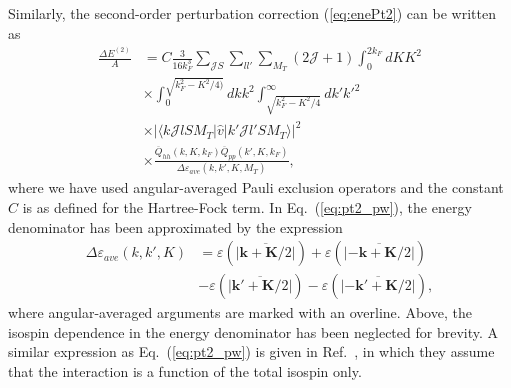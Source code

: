 \documentclass[a4paper,12pt]{report}
\begin{document}
Similarly, the second-order perturbation correction (\ref{eq:enePt2}) can be written as
\begin{align}
  \frac{\Delta E^{(2)}}{A} &= C\frac{3}{16k_{F}^{3}}\sum_{\mathcal{J}S}\sum_{ll'}\sum_{M_{T}}(2\mathcal{J}+1)\int_{0}^{2k_{F}}dK K^{2} \nonumber \\
  & \times \int_{0}^{\sqrt{k_{F}^{2}-K^{2}/4)}}dk k^{2} \int_{\sqrt{k_{F}^{2}-K^{2}/4}}^{\infty }dk' k'^{2} \nonumber \\
  & \times |\langle k\mathcal{J}lSM_{T}|\hat{v}|k'\mathcal{J}l'SM_{T}\rangle |^{2} \nonumber \\
  & \times \frac{\overline{Q}_{hh}(k, K, k_{F})\overline{Q}_{pp}(k', K, k_{F})}{\Delta \varepsilon_{ave}(k, k', K, M_{T})},
  \label{eq:pt2_pw}
\end{align}
where we have used angular-averaged Pauli exclusion operators and 
the constant $C$ is as defined for the Hartree-Fock term. In 
Eq.~(\ref{eq:pt2_pw}), the 
energy denominator has been approximated by the expression
\begin{align}
   \Delta \varepsilon_{ave}(k, k', K) &= \varepsilon(\overline{|\mathbf{k}+\mathbf{K}/2|}) + \varepsilon(\overline{|-\mathbf{k}+\mathbf{K}/2|}) \nonumber \\
   &- \varepsilon(\overline{|\mathbf{k}'+\mathbf{K}/2|}) - \varepsilon(\overline{|-\mathbf{k}'+\mathbf{K}/2|}),
   \label{eq:ene_denom_av}
\end{align}
where angular-averaged arguments are marked with an overline. Above, the isospin dependence in the energy denominator has been neglected for brevity. A similar expression as Eq.~(\ref{eq:pt2_pw}) is given in Ref.~\cite{mackenzie}, in which they assume that the interaction is a function of the total isospin only.
\end{document}
